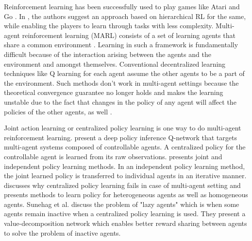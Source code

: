 \documentclass[conference]{IEEEtran}
\begin{document}
Reinforcement learning has been successfully used to play games like Atari \cite{mnih2013playing} and Go \cite{silver2017mastering}. In \cite{liu2009pursuit}, the authors suggest an approach based on hierarchical RL for the same, while enabling the players to learn through tasks with less complexity. Multi-agent reinforcement learning (MARL) consists of a set of learning agents that share a common environment \cite{busoniu2008comprehensive}. Learning in such a framework is fundamentally difficult because of the interaction arising between the agents and the environment and amongst themselves. Conventional decentralized learning techniques like Q learning for each agent \cite{tan1993multi} assume the other agents to be a part of the environment. Such methods don't work in multi-agent settings because the theoretical convergence guarantee no longer holds and makes the learning unstable due to the fact that changes in the policy of any agent will affect the policies of the other agents, as well \cite{matignon2012independent}.

Joint action learning or centralized policy learning is one way to do multi-agent reinforcement learning. \cite{hong2018aamas} present a deep policy inference Q-network that targets multi-agent systems composed of controllable agents. A centralized policy for the controllable agent is learned from its raw observations. \cite{OmidshafieiPAHV17} presents joint and independent policy learning methods. In an independent policy learning method, the joint learned policy is transferred to individual agents in an iterative manner. \cite{Gupta2017} discusses why centralized policy learning fails in case of multi-agent setting and presents methods to learn policy for heterogeneous agents as well as homogeneous agents. Sunehag et al. \cite{Sunehag2018} discuss the problem of "lazy agents" which is when some agents remain inactive when a centralized policy learning is used. They present a value-decomposition network which enables better reward sharing between agents to solve the problem of inactive agents.
\end{document}
